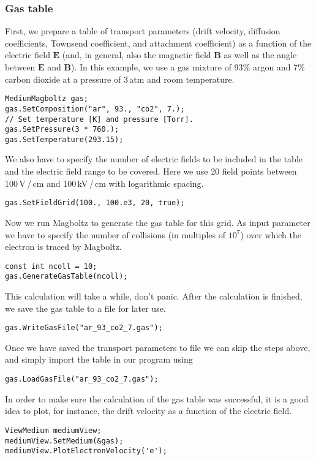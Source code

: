 \subsubsection{Gas table}
First, we prepare a table of transport parameters 
(drift velocity, diffusion coefficients, Townsend coefficient,
and attachment coefficient) as a function 
of the electric field \(\mathbf{E}\)  
(and, in general, also the magnetic field \(\mathbf{B}\) 
as well as the angle between \(\mathbf{E}\) and \(\mathbf{B}\)).
In this example, we use a gas mixture of 93\% argon and 7\% 
carbon dioxide at a pressure of 3\,atm and room temperature.
\begin{lstlisting}
MediumMagboltz gas;
gas.SetComposition("ar", 93., "co2", 7.);
// Set temperature [K] and pressure [Torr].
gas.SetPressure(3 * 760.);
gas.SetTemperature(293.15);
\end{lstlisting} 
We also have to specify the number of electric fields to be 
included in the table and the electric field range to be covered. 
Here we use 20 field points between 100\,V\,/\,cm and 100\,kV\,/\,cm 
with logarithmic spacing. 
\begin{lstlisting}
gas.SetFieldGrid(100., 100.e3, 20, true);
\end{lstlisting}
Now we run Magboltz to generate the gas table for this grid. 
As input parameter we have to specify the number of collisions 
(in multiples of \(10^{7}\)) over which the electron is traced 
by Magboltz.
\begin{lstlisting}
const int ncoll = 10;
gas.GenerateGasTable(ncoll);
\end{lstlisting}
This calculation will take a while, don't panic. 
After the calculation is finished, we save the gas table to a 
file for later use.
\begin{lstlisting}
gas.WriteGasFile("ar_93_co2_7.gas");
\end{lstlisting}
Once we have saved the transport parameters to file 
we can skip the steps above, 
and simply import the table in our program using
\begin{lstlisting}
gas.LoadGasFile("ar_93_co2_7.gas");
\end{lstlisting} 

In order to make sure the calculation of the gas table was successful, 
it is a good idea to plot, for instance, 
the drift velocity as a function of the electric field.
\begin{lstlisting}
ViewMedium mediumView;
mediumView.SetMedium(&gas);
mediumView.PlotElectronVelocity('e');
\end{lstlisting}
